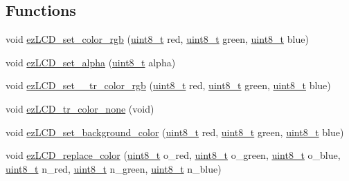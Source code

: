 \subsection*{Functions}
\begin{DoxyCompactItemize}
\item 
void \hyperlink{group__ez_l_c_d__103__colors_ga6b18ed4d0fb08b58b43a66a507a53dec}{ez\-L\-C\-D\-\_\-set\-\_\-color\-\_\-rgb} (\hyperlink{group__ez_l_c_d__103__common_gaba7bc1797add20fe3efdf37ced1182c5}{uint8\-\_\-t} red, \hyperlink{group__ez_l_c_d__103__common_gaba7bc1797add20fe3efdf37ced1182c5}{uint8\-\_\-t} green, \hyperlink{group__ez_l_c_d__103__common_gaba7bc1797add20fe3efdf37ced1182c5}{uint8\-\_\-t} blue)
\item 
void \hyperlink{group__ez_l_c_d__103__colors_ga2291620d4919e7297ee87dcfd9c9e290}{ez\-L\-C\-D\-\_\-set\-\_\-alpha} (\hyperlink{group__ez_l_c_d__103__common_gaba7bc1797add20fe3efdf37ced1182c5}{uint8\-\_\-t} alpha)
\item 
void \hyperlink{group__ez_l_c_d__103__colors_gaaa4db3da90e41dcb2b47cb8072281d2f}{ez\-L\-C\-D\-\_\-set\-\_\-\-\_\-tr\-\_\-color\-\_\-rgb} (\hyperlink{group__ez_l_c_d__103__common_gaba7bc1797add20fe3efdf37ced1182c5}{uint8\-\_\-t} red, \hyperlink{group__ez_l_c_d__103__common_gaba7bc1797add20fe3efdf37ced1182c5}{uint8\-\_\-t} green, \hyperlink{group__ez_l_c_d__103__common_gaba7bc1797add20fe3efdf37ced1182c5}{uint8\-\_\-t} blue)
\item 
void \hyperlink{group__ez_l_c_d__103__colors_ga98b12a4ecd2d13ec00394e4918ffc9d4}{ez\-L\-C\-D\-\_\-tr\-\_\-color\-\_\-none} (void)
\item 
void \hyperlink{group__ez_l_c_d__103__colors_gaad1ac28d20d1fea38fab9a0a46dcdaa1}{ez\-L\-C\-D\-\_\-set\-\_\-background\-\_\-color} (\hyperlink{group__ez_l_c_d__103__common_gaba7bc1797add20fe3efdf37ced1182c5}{uint8\-\_\-t} red, \hyperlink{group__ez_l_c_d__103__common_gaba7bc1797add20fe3efdf37ced1182c5}{uint8\-\_\-t} green, \hyperlink{group__ez_l_c_d__103__common_gaba7bc1797add20fe3efdf37ced1182c5}{uint8\-\_\-t} blue)
\item 
void \hyperlink{group__ez_l_c_d__103__colors_ga12694e65a7ddc32673467d08a8d6382d}{ez\-L\-C\-D\-\_\-replace\-\_\-color} (\hyperlink{group__ez_l_c_d__103__common_gaba7bc1797add20fe3efdf37ced1182c5}{uint8\-\_\-t} o\-\_\-red, \hyperlink{group__ez_l_c_d__103__common_gaba7bc1797add20fe3efdf37ced1182c5}{uint8\-\_\-t} o\-\_\-green, \hyperlink{group__ez_l_c_d__103__common_gaba7bc1797add20fe3efdf37ced1182c5}{uint8\-\_\-t} o\-\_\-blue, \hyperlink{group__ez_l_c_d__103__common_gaba7bc1797add20fe3efdf37ced1182c5}{uint8\-\_\-t} n\-\_\-red, \hyperlink{group__ez_l_c_d__103__common_gaba7bc1797add20fe3efdf37ced1182c5}{uint8\-\_\-t} n\-\_\-green, \hyperlink{group__ez_l_c_d__103__common_gaba7bc1797add20fe3efdf37ced1182c5}{uint8\-\_\-t} n\-\_\-blue)
\end{DoxyCompactItemize}


